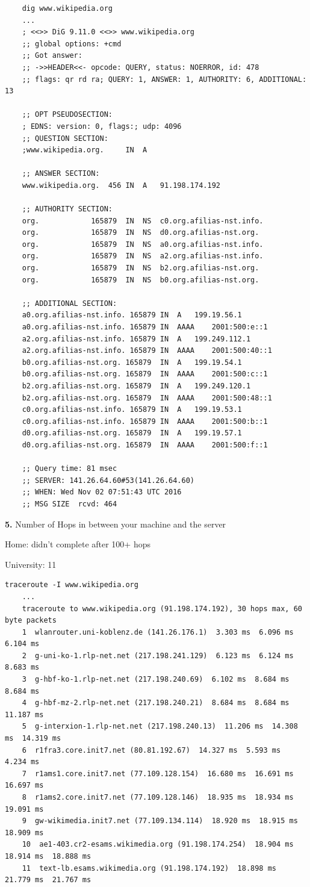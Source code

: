 \documentclass[12pt]{article}
\begin{document}
\begin{lstlisting}
	dig www.wikipedia.org
	...
	; <<>> DiG 9.11.0 <<>> www.wikipedia.org
	;; global options: +cmd
	;; Got answer:
	;; ->>HEADER<<- opcode: QUERY, status: NOERROR, id: 478
	;; flags: qr rd ra; QUERY: 1, ANSWER: 1, AUTHORITY: 6, ADDITIONAL: 13

	;; OPT PSEUDOSECTION:
	; EDNS: version: 0, flags:; udp: 4096
	;; QUESTION SECTION:
	;www.wikipedia.org.		IN	A

	;; ANSWER SECTION:
	www.wikipedia.org.	456	IN	A	91.198.174.192

	;; AUTHORITY SECTION:
	org.			165879	IN	NS	c0.org.afilias-nst.info.
	org.			165879	IN	NS	d0.org.afilias-nst.org.
	org.			165879	IN	NS	a0.org.afilias-nst.info.
	org.			165879	IN	NS	a2.org.afilias-nst.info.
	org.			165879	IN	NS	b2.org.afilias-nst.org.
	org.			165879	IN	NS	b0.org.afilias-nst.org.

	;; ADDITIONAL SECTION:
	a0.org.afilias-nst.info. 165879	IN	A	199.19.56.1
	a0.org.afilias-nst.info. 165879	IN	AAAA	2001:500:e::1
	a2.org.afilias-nst.info. 165879	IN	A	199.249.112.1
	a2.org.afilias-nst.info. 165879	IN	AAAA	2001:500:40::1
	b0.org.afilias-nst.org.	165879	IN	A	199.19.54.1
	b0.org.afilias-nst.org.	165879	IN	AAAA	2001:500:c::1
	b2.org.afilias-nst.org.	165879	IN	A	199.249.120.1
	b2.org.afilias-nst.org.	165879	IN	AAAA	2001:500:48::1
	c0.org.afilias-nst.info. 165879	IN	A	199.19.53.1
	c0.org.afilias-nst.info. 165879	IN	AAAA	2001:500:b::1
	d0.org.afilias-nst.org.	165879	IN	A	199.19.57.1
	d0.org.afilias-nst.org.	165879	IN	AAAA	2001:500:f::1

	;; Query time: 81 msec
	;; SERVER: 141.26.64.60#53(141.26.64.60)
	;; WHEN: Wed Nov 02 07:51:43 UTC 2016
	;; MSG SIZE  rcvd: 464
\end{lstlisting}

\textbf{5.} Number of Hops in between your machine and the server

Home: didn't complete after 100+ hops

University: 11

\begin{lstlisting}[caption=traceroute university]
	traceroute -I www.wikipedia.org
	...
	traceroute to www.wikipedia.org (91.198.174.192), 30 hops max, 60 byte packets
	1  wlanrouter.uni-koblenz.de (141.26.176.1)  3.303 ms  6.096 ms  6.104 ms
	2  g-uni-ko-1.rlp-net.net (217.198.241.129)  6.123 ms  6.124 ms  8.683 ms
	3  g-hbf-ko-1.rlp-net.net (217.198.240.69)  6.102 ms  8.684 ms  8.684 ms
	4  g-hbf-mz-2.rlp-net.net (217.198.240.21)  8.684 ms  8.684 ms  11.187 ms
	5  g-interxion-1.rlp-net.net (217.198.240.13)  11.206 ms  14.308 ms  14.319 ms
	6  r1fra3.core.init7.net (80.81.192.67)  14.327 ms  5.593 ms  4.234 ms
	7  r1ams1.core.init7.net (77.109.128.154)  16.680 ms  16.691 ms  16.697 ms
	8  r1ams2.core.init7.net (77.109.128.146)  18.935 ms  18.934 ms  19.091 ms
	9  gw-wikimedia.init7.net (77.109.134.114)  18.920 ms  18.915 ms  18.909 ms
	10  ae1-403.cr2-esams.wikimedia.org (91.198.174.254)  18.904 ms  18.914 ms  18.888 ms
	11  text-lb.esams.wikimedia.org (91.198.174.192)  18.898 ms  21.779 ms  21.767 ms
\end{lstlisting}
\end{document}
